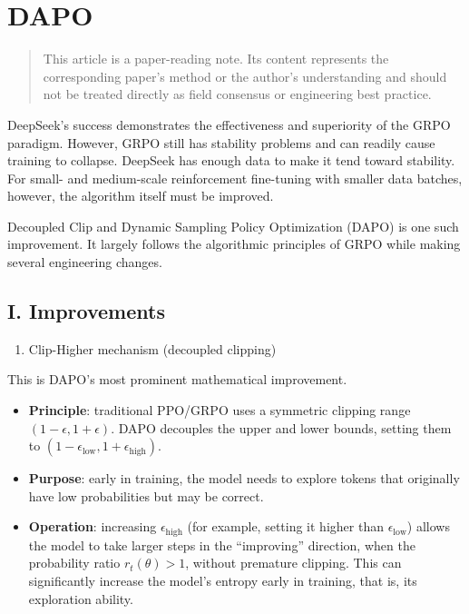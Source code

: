 \setcounter{section}{0}

\hypertarget{dapo}{%
\section{DAPO}\label{dapo}}

\begin{quote}
This article is a paper-reading note. Its content represents the corresponding paper's method or the author's understanding and should not be treated directly as field consensus or engineering best practice.
\end{quote}

DeepSeek's success demonstrates the effectiveness and superiority of the GRPO paradigm. However, GRPO still has stability problems and can readily cause training to collapse. DeepSeek has enough data to make it tend toward stability. For small- and medium-scale reinforcement fine-tuning with smaller data batches, however, the algorithm itself must be improved.

Decoupled Clip and Dynamic Sampling Policy Optimization (DAPO) is one such improvement. It largely follows the algorithmic principles of GRPO while making several engineering changes.

\hypertarget{i.-improvements}{%
\subsection{I. Improvements}\label{i.-improvements}}

\begin{enumerate}
\def\labelenumi{\arabic{enumi}.}
\tightlist
\item
  Clip-Higher mechanism (decoupled clipping)
\end{enumerate}

This is DAPO's most prominent mathematical improvement.

\begin{itemize}
\tightlist
\item
  \textbf{Principle}: traditional PPO/GRPO uses a symmetric clipping range \((1-\epsilon, 1+\epsilon)\). DAPO decouples the upper and lower bounds, setting them to \((1-\epsilon_{\mathrm{low}}, 1+\epsilon_{\mathrm{high}})\).
\item
  \textbf{Purpose}: early in training, the model needs to explore tokens that originally have low probabilities but may be correct.
\item
  \textbf{Operation}: increasing \(\epsilon_{\mathrm{high}}\) (for example, setting it higher than \(\epsilon_{\mathrm{low}}\)) allows the model to take larger steps in the ``improving'' direction, when the probability ratio \(r_t(\theta)>1\), without premature clipping. This can significantly increase the model's entropy early in training, that is, its exploration ability.
\end{itemize}

